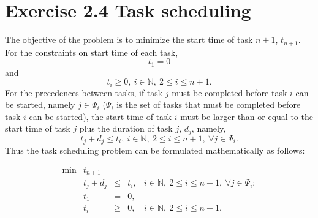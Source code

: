\section{Exercise 2.4 Task scheduling}

The objective of the problem is to minimize the start time of task $n+1$, $t_{n+1}$. For the constraints on start time of each task, $$t_1 = 0$$ and $$t_i \geq 0, ~i \in \mathbb{N}, ~2 \leq i \leq n+1.$$ For the precedences between tasks, if task $j$ must be completed before task $i$ can be started, namely $j \in \Psi_i$ ($\Psi_i$ is the set of tasks that must be completed before task $i$ can be started), the start time of task $i$ must be larger than or equal to the start time of task $j$ plus the duration of task $j$, $d_j$, namely, $$t_j + d_j \leq t_i,~i \in \mathbb{N}, ~2 \leq i \leq n+1,~\forall j \in \Psi_i.$$ Thus the task scheduling problem can be formulated mathematically as follows:

\[
\begin{array}{rrcll}
 \min & t_{n+1}  &  &   & \\
      &  t_j + d_j  &   \leq  & t_i, &i \in \mathbb{N}, ~2 \leq i \leq n+1,~\forall j \in \Psi_i; \\
      &  t_1 & = & 0, & \\
      &  t_i & \geq & 0, & i \in \mathbb{N}, ~2 \leq i \leq n+1.
\end{array}
\]


